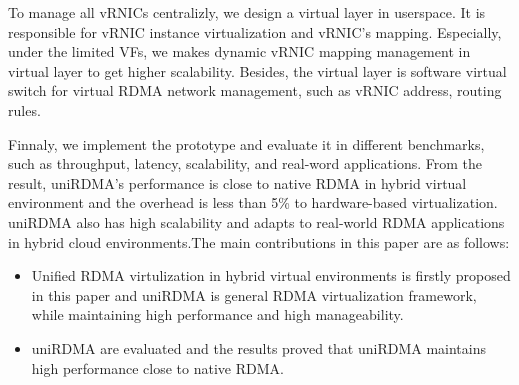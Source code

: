 To manage all vRNICs centralizly, we design a virtual layer in userspace. It is responsible for vRNIC instance virtualization and vRNIC's mapping. Especially, under the limited VFs, we makes dynamic vRNIC mapping management in virtual layer to get higher scalability. Besides, the virtual layer is software virtual switch for virtual RDMA network management, such as vRNIC address, routing rules.

Finnaly, we implement the prototype and evaluate it in different benchmarks, such as throughput, latency, scalability, and real-word applications. From the result, uniRDMA's performance is close to native RDMA in hybrid virtual environment and the overhead is less than 5\% to hardware-based virtualization. uniRDMA also has high scalability and adapts to real-world RDMA applications in hybrid cloud environments.The main contributions in this paper are as follows:

\begin{itemize}
\item Unified RDMA virtulization in hybrid virtual environments is firstly proposed in this paper and uniRDMA is general RDMA virtualization framework,  while maintaining high performance and high manageability.

\item uniRDMA are evaluated and the results proved that uniRDMA maintains high performance close to native RDMA.
\end{itemize}
